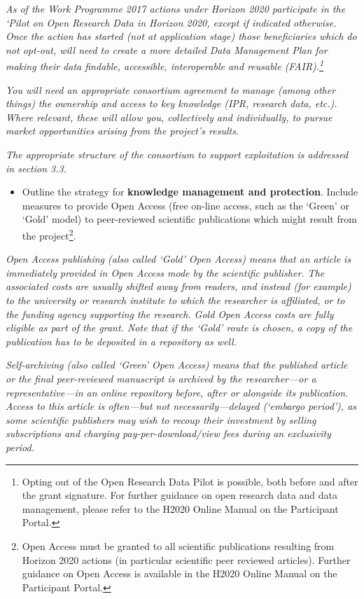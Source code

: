 {\textit{As of the Work Programme 2017 actions under Horizon 2020 participate in
the `Pilot on Open Research Data in Horizon 2020, except if indicated otherwise.
Once the action has started (not at application stage) those beneficiaries which
do not opt-out, will need to create a more detailed Data Management Plan for
making their data findable, accessible, interoperable and reusable
(FAIR).\footnote{Opting out of the Open Research Data Pilot is possible, both
before and after the grant signature. For further guidance on open research data
and data management, please refer to the H2020 Online Manual on the Participant
Portal.}}

\textit{You will need an appropriate consortium agreement to manage (among other
things) the ownership and access to key knowledge (IPR, research data, etc.).
Where relevant, these will allow you, collectively and individually, to pursue
market opportunities arising from the project's results.}

\textit{The appropriate structure of the consortium to support exploitation is
addressed in section 3.3.}

\begin{itemize}
\item Outline the strategy for \textbf{knowledge management and protection}.
Include measures to provide Open Access (free on-line access, such as the
`Green' or `Gold' model) to peer-reviewed scientific publications which might
result from the project\footnote{Open Access must be granted to all scientific
publications resulting from Horizon 2020 actions (in particular scientific peer
reviewed articles). Further guidance on Open Access is available in the H2020
Online Manual on the Participant Portal.}.
\end{itemize}

\textit{Open Access publishing (also called `Gold' Open Access) means that an
article is immediately provided in Open Access mode by the scientific publisher.
The associated costs are usually shifted away from readers, and instead (for
example) to the university or research institute to which the researcher is
affiliated, or to the funding agency supporting the research. Gold Open Access
costs are fully eligible as part of the grant. Note that if the `Gold' route is
chosen, a copy of the publication has to be deposited in a repository as well.}

\textit{Self-archiving (also called `Green' Open Access) means that the
published article or the final peer-reviewed manuscript is archived by the
researcher---or a representative---in an online repository before, after or
alongside its publication. Access to this article is often---but not
necessarily---delayed (`embargo period'), as some scientific publishers may wish
to recoup their investment by selling subscriptions and charging
pay-per-download/view fees during an exclusivity period. } }

